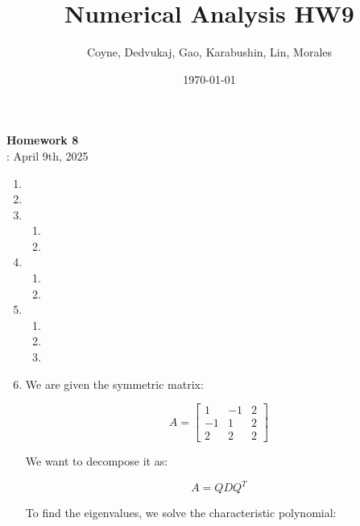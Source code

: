 \documentclass[12pt]{article}
\title{Numerical Analysis HW9}
\author{Coyne, Dedvukaj, Gao, Karabushin, Lin, Morales}
\date{\today}
\begin{document}
\pagestyle{fancy}


\begin{center}
\textbf{\Large Homework 8} \\
: April 9th, 2025
\end{center}

\begin{enumerate}[leftmargin=0em]
    \item 

    \item 

    \item
    \begin{enumerate}[leftmargin=!]
        \item
        \item 
    \end{enumerate} 

    \item
    \begin{enumerate}[leftmargin=!]
        \item
        \item 
    \end{enumerate}

    \item
    \begin{enumerate}[leftmargin=!]
        \item 
        \item 
        \item 
    \end{enumerate}

    \item We are given the symmetric matrix:

    \[
    A = \begin{bmatrix}
    1 & -1 & 2 \\
    -1 & 1 & 2 \\
    2 & 2 & 2
    \end{bmatrix}
    \]
    
    We want to decompose it as:
    
    \[
    A = Q D Q^T
    \]
    
    To find the eigenvalues, we solve the characteristic polynomial:
    

\end{enumerate}
\end{document}
